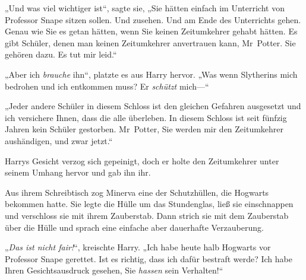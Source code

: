 „Und was viel wichtiger ist“, sagte sie, „Sie hätten einfach im Unterricht von Professor Snape sitzen sollen. Und zusehen. Und am Ende des Unterrichts gehen. Genau wie Sie es getan hätten, wenn Sie keinen Zeitumkehrer gehabt hätten. Es gibt Schüler, denen man keinen Zeitumkehrer anvertrauen kann, Mr~Potter. Sie gehören dazu. Es tut mir leid.“

„Aber ich \emph{brauche} ihn“, platzte es aus Harry hervor. „Was wenn Slytherins mich bedrohen und ich entkommen muss? Er \emph{schützt} mich—“

„Jeder andere Schüler in diesem Schloss ist den gleichen Gefahren ausgesetzt und ich versichere Ihnen, dass die alle überleben. In diesem Schloss ist seit fünfzig Jahren kein Schüler gestorben. Mr~Potter, Sie werden mir den Zeitumkehrer aushändigen, und zwar jetzt.“

Harrys Gesicht verzog sich gepeinigt, doch er holte den Zeitumkehrer unter seinem Umhang hervor und gab ihn ihr.

Aus ihrem Schreibtisch zog Minerva eine der Schutzhüllen, die Hogwarts bekommen hatte. Sie legte die Hülle um das Stundenglas, ließ sie einschnappen und verschloss sie mit ihrem Zauberstab. Dann strich sie mit dem Zauberstab über die Hülle und sprach eine einfache aber dauerhafte Verzauberung.

„\emph{Das ist nicht fair!}“, kreischte Harry. „Ich habe heute halb Hogwarts vor Professor Snape gerettet. Ist es richtig, dass ich dafür bestraft werde? Ich habe Ihren Gesichtsausdruck gesehen, Sie \emph{hassen} sein Verhalten!“

